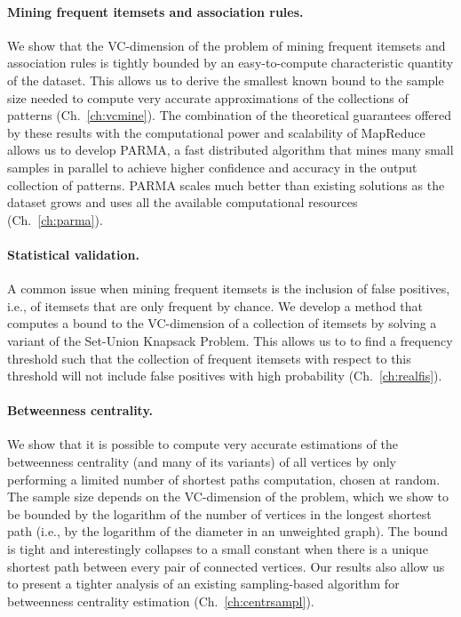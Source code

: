 \paragraph*{Mining frequent itemsets and association rules.} We show that the
VC-dimension of the problem of mining frequent itemsets and association rules is
tightly bounded by an easy-to-compute characteristic quantity of the dataset.
This allows us to derive the smallest known bound to the sample size needed to
compute very accurate approximations of the collections of patterns
(Ch.~\ref{ch:vcmine}). The combination of the theoretical guarantees offered by
these results with the computational power and scalability of MapReduce allows us
to develop PARMA, a fast distributed algorithm that mines many small samples in
parallel to achieve higher confidence and accuracy in the output collection of
patterns. PARMA scales much better than existing solutions as the dataset grows
and uses all the available computational resources (Ch.~\ref{ch:parma}). 

\paragraph*{Statistical validation.} A common issue when mining frequent
itemsets is the inclusion of false positives, i.e., of itemsets that are only
frequent by chance. We develop a method that computes a bound to the VC-dimension
of a collection of itemsets by solving a variant of the Set-Union Knapsack
Problem. This allows us to to find a frequency threshold such that the
collection of frequent itemsets with respect to this threshold will not include
false positives with high probability (Ch.~\ref{ch:realfis}).

\paragraph*{Betweenness centrality.} We show that it is possible to compute very
accurate estimations of the betweenness centrality (and many of its variants) of
all vertices by only performing a limited number of shortest paths computation,
chosen at random. The sample size depends on the VC-dimension of the problem,
which we show to be bounded by the logarithm of the number of vertices in the
longest shortest path (i.e., by the logarithm of the diameter in an unweighted
graph). The bound is tight and interestingly collapses to a small constant when
there is a unique shortest path between every pair of connected vertices. Our
results also allow us to present a tighter analysis of an existing
sampling-based algorithm for betweenness centrality estimation
(Ch.~\ref{ch:centrsampl}).

